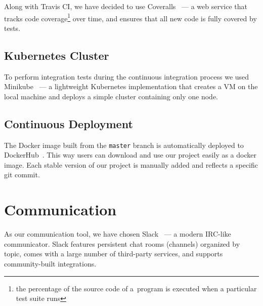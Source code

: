Along with Travis CI, we have 
decided to use Coveralls~\cite{coveralls} --- a web service that 
tracks code coverage\footnote{the percentage of the source code of a~program 
is executed when a particular test suite runs} over time, and ensures that 
all new code is fully covered by tests.

\subsection{Kubernetes Cluster}
To perform integration tests during the continuous integration process we 
used Minikube~\cite{minikube} --- a lightweight
Kubernetes implementation that creates a VM on the local machine and deploys 
a simple cluster containing only one node.

\subsection{Continuous Deployment}
The Docker image built from the \texttt{master} branch is automatically 
deployed to DockerHub~\cite{docker}. This way users can download
and use our project easily as a docker image. Each stable version of our 
project is manually added and reflects a specific git commit.

\section{Communication}
As our communication tool, we have chosen Slack~\cite{slack} --- 
a modern IRC-like communicator. Slack features persistent chat rooms
(channels) organized by topic, comes with a large number of third-party 
services, and supports community-built integrations.
